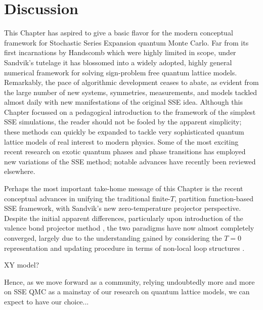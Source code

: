 \documentclass[vecphys]{svmult}
\begin{document}
\section{Discussion}

This Chapter has aspired to give a basic flavor for the modern conceptual framework for Stochastic Series Expansion quantum Monte Carlo.  Far from its first incarnations by Handscomb which were highly limited in scope, under Sandvik's tutelage it has blossomed into
a widely adopted, highly general numerical framework for solving sign-problem free quantum lattice models.  Remarkably, the pace of algorithmic development ceases to abate, as evident from the large number of new systems, symmetries, measurements, and models tackled almost daily with new manifestations of the original SSE idea.  Although this Chapter focussed on a pedagogical introduction to the framework of the simplest SSE simulations, the reader should not be fooled by the apparent simplicity;
these methods can quickly be expanded to tackle very sophisticated quantum lattice models of real interest to modern physics.  Some of the most exciting recent research on exotic quantum phases and phase transitions has employed new variations of the SSE method; notable advances have recently been reviewed elsewhere.

Perhaps the most important take-home message of this Chapter is the recent conceptual advances in unifying the traditional finite-$T$, partition function-based SSE framework, with Sandvik's new zero-temperature projector perspective.  Despite the initial apparent differences, particularly upon introduction of the valence bond projector method \cite{Melko:Sandvik05}, the two paradigms have now almost completely converged, largely due to the understanding gained by considering the $T=0$ representation and updating procedure in terms of non-local loop structures \cite{Melko:Sandvik10a}.

XY model?

Hence, as we move forward as a community, relying undoubtedly more and more on SSE QMC as a mainstay of our research on quantum lattice models, we can expect to have our choice...


\end{document}

